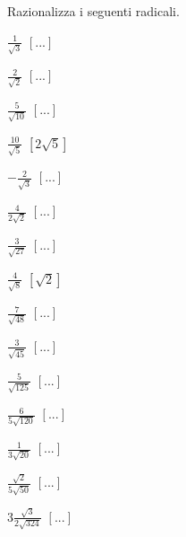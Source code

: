 \begin{esercizio}[\Ast]
 \label{ese:2.68}
Razionalizza i seguenti radicali.
 \begin{multicols}{4}
 \begin{enumeratea}
 \item $\frac 1{\sqrt 3}$
  \hfill $\left[...\right]$
 \item $\frac 2{\sqrt 2}$
  \hfill $\left[...\right]$
 \item $\frac 5{\sqrt{10}}$
  \hfill $\left[...\right]$
 \item $\frac{10}{\sqrt 5}$
  \hfill $\left[2\sqrt 5\right]$
 \item $-\frac 2{\sqrt 3}$
  \hfill $\left[...\right]$
 \item $\frac 4{2\sqrt 2}$
  \hfill $\left[...\right]$
 \item $\frac 3{\sqrt{27}}$
  \hfill $\left[...\right]$
 \item $\frac 4{\sqrt 8}$
  \hfill $\left[\sqrt 2\right]$
 \item $\frac 7{\sqrt{48}}$
  \hfill $\left[...\right]$
 \item $\frac 3{\sqrt{45}}$
  \hfill $\left[...\right]$
 \item $\frac 5{\sqrt{125}}$
  \hfill $\left[...\right]$
 \item $\frac 6{5\sqrt{120}}$
  \hfill $\left[...\right]$
 \item $\frac 1{3\sqrt{20}}$
  \hfill $\left[...\right]$
 \item $\frac{\sqrt 2}{5\sqrt{50}}$
  \hfill $\left[...\right]$
 \item $3\frac{\sqrt 3}{2\sqrt{324}}$
  \hfill $\left[...\right]$

\end{enumeratea}
\end{multicols}
\end{esercizio}
